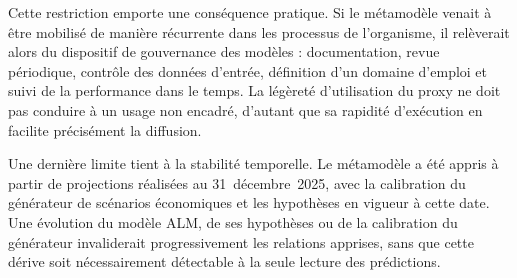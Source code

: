 Cette restriction emporte une conséquence pratique. Si le métamodèle venait à être mobilisé de manière récurrente dans les processus de l'organisme, il relèverait alors du dispositif de gouvernance des modèles : documentation, revue périodique, contrôle des données d'entrée, définition d'un domaine d'emploi et suivi de la performance dans le temps. La légèreté d'utilisation du proxy ne doit pas conduire à un usage non encadré, d'autant que sa rapidité d'exécution en facilite précisément la diffusion.

Une dernière limite tient à la stabilité temporelle. Le métamodèle a été appris à partir de projections réalisées au 31~décembre~2025, avec la calibration du générateur de scénarios économiques et les hypothèses en vigueur à cette date. Une évolution du modèle ALM, de ses hypothèses ou de la calibration du générateur invaliderait progressivement les relations apprises, sans que cette dérive soit nécessairement détectable à la seule lecture des prédictions.

